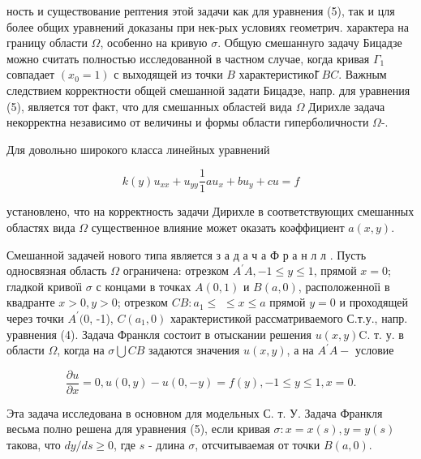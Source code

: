 \documentclass[10pt]{article}
\begin{document}
ность и существование рептения этой задачи как для уравнения (5), так и цля более общих уравнений доказаны при нек-рых условиях геометрич. характера на границу области $\Omega$, особенно на кривую $\sigma$. Общую смешаннуго задачу Бицадзе можно считать полностью исследованной в частном случае, когда кривая $\Gamma_{1}$ совпадает $\left(x_{0}=1\right)$ с выходящей из точки $B$ характеристикоІ̆ $B C$. Важным следствием корректности общей смешанной задати Бицадзе, напр. для уравнения (5), является тот факт, что для смешанных областей вида $\Omega$ Дирихле задача некорректна независимо от величины и формы области гиперболичности $\Omega$-.



Для доволњно широкого класса линейных уравнений



\[

k(y) u_{x x}+u_{y y} \frac{1}{1} a u_{x}+b u_{y}+c u=f

\]



установлено, что на корректность задачи Дирихле в соответствующих смешанных областях вида $\Omega$ существенное влияние может оказать коәффициент $a(x, y)$.



Смешанной задачей нового типа является з а д а ч а Ф р а н л л . Пусть односвязная область $\Omega$ ограничена: отрезком $A^{\prime} A,-1 \leqslant y \leqslant 1$, прямой $x=0$; гладкой кривоїі $\sigma$ с концами в точках $A(0,1)$ и $B(a, 0)$, расположенноїі в квадранте $x>0, y>0$; отрезком $C B: a_{1} \leqslant$ $\leqslant x \leqslant a$ прямой $y=0$ и проходящей через точки $A^{\prime}(0$, -1), $C\left(a_{1}, 0\right)$ характеристикой рассматриваемого С.т.у., напр. уравнения (4). Задача Франкля состоит в отыскании решения $u(x, y) \mathrm{C}$. т. у. в области $\Omega$, когда на $\sigma \bigcup C B$ задаются значения $u(x, y)$, а на $A^{\prime} A-$ условие



\[

\frac{\partial u}{\partial x}=0, u(0, y)-u(0,-y)=f(y),-1 \leqslant y \leqslant 1, x=0 .

\]



Эта задача исследована в основном для модельных С. т. У. Задача Франкля весьма полно решена для уравнения (5), если кривая $\sigma: x=x(s), y=y(s)$ такова, что $d y / d s \geqslant 0$, где $s$ - длина $\sigma$, отсчитываемая от точки $B(a, 0)$.
\end{document}
